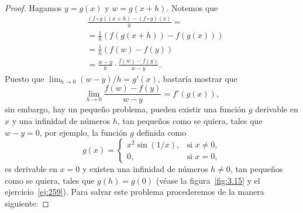 \documentclass[12pt,a4paper]{book}
\begin{document}
    \begin{proof}
        Hagamos $y=g(x)$ y $w=g(x+h)$. Notemos que
        \begin{align*}
            &\frac{(f\circ g)(x+h)-(f\circ g)(x)}{h}=\\
            &=\frac{1}{h}\left(f(g(x+h))-f(g(x))\right)\\
            &=\frac{1}{h}\left(f(w)-f(y)\right)\\
            &=\frac{w-y}{h}\cdot\frac{f(w)-f(y)}{w-y}.
        \end{align*}
        Puesto que $\lim_{h\to 0}(w-y)/h=g'(x)$, bastaría mostrar que
        \begin{equation*}
            \lim_{h\to 0}\frac{f(w)-f(y)}{w-y}=f'(g(x)),
        \end{equation*}
        sin embargo, hay un pequeño problema, pueden existir una función $g$ derivable
        en $x$ y una infinidad de números $h$, tan pequeños como se quiera, tales
        que $w-y=0$, por ejemplo, la función $g$ definida como
        \begin{equation}\label{eq:5.10}
            g(x)=\begin{cases}
                x^{2}\sin(1/x), & \text{si }x\neq 0,\\
                0, & \text{si }x=0,
            \end{cases}
        \end{equation}
        es derivable en $x=0$ y existen una infinidad de números $h\neq 0$, tan pequeños
        como se quiera, tales que $g(h)=g(0)$ (véase la figura~\ref{fig:3.15} y el ejercicio~\ref{ej:259}).
        Para salvar este problema procederemos de la manera siguiente:


\end{proof}
\end{document}
